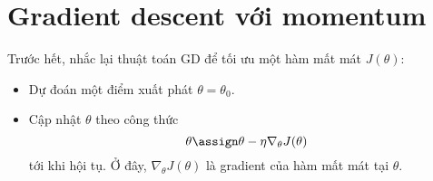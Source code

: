 




\newpage
\section{Gradient descent với momentum}



Trước hết, nhắc lại thuật toán GD để tối ưu một hàm mất mát $J(\theta)$:
\begin{itemize}
\item  Dự đoán một điểm xuất phát $\theta = \theta_0$.
\item  Cập nhật $\theta$ theo công thức
\begin{equation}
\theta \assign \theta - \eta \nabla_{\theta}J(\theta)
\end{equation}
tới khi hội tụ. Ở đây, $\nabla_{\theta}J(\theta)$ là gradient của hàm mất mát tại $\theta$.
\end{itemize}


